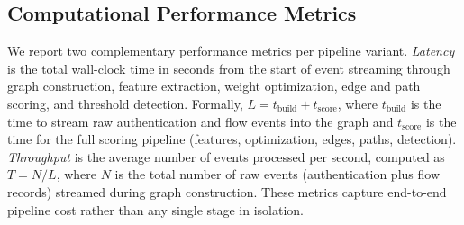 
\subsection{Computational Performance Metrics}
\label{sec:latency_throughput}

We report two complementary performance metrics per pipeline variant. \emph{Latency} is the total wall-clock time in seconds from the start of event streaming through graph construction, feature extraction, weight optimization, edge and path scoring, and threshold detection. Formally, $L = t_{\text{build}} + t_{\text{score}}$, where $t_{\text{build}}$ is the time to stream raw authentication and flow events into the graph and $t_{\text{score}}$ is the time for the full scoring pipeline (features, optimization, edges, paths, detection). \emph{Throughput} is the average number of events processed per second, computed as $T = N / L$, where $N$ is the total number of raw events (authentication plus flow records) streamed during graph construction. These metrics capture end-to-end pipeline cost rather than any single stage in isolation.
